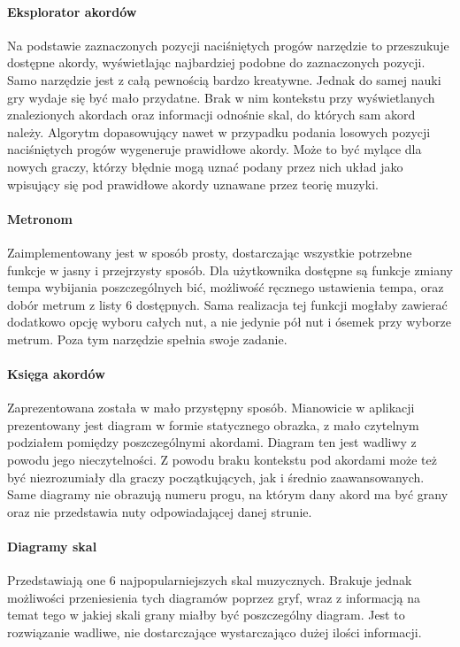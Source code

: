 \paragraph{Eksplorator akordów}
Na podstawie zaznaczonych pozycji naciśniętych progów narzędzie to przeszukuje dostępne akordy, wyświetlając najbardziej podobne do zaznaczonych pozycji. Samo narzędzie jest z całą pewnością bardzo kreatywne. Jednak do samej nauki gry wydaje się być mało przydatne. Brak w nim kontekstu przy wyświetlanych znalezionych akordach oraz informacji odnośnie skal, do których sam akord należy. Algorytm dopasowujący nawet w przypadku podania losowych pozycji naciśniętych progów wygeneruje prawidłowe akordy. Może to być mylące dla nowych graczy, którzy błędnie mogą uznać podany przez nich układ jako wpisujący się pod prawidłowe akordy uznawane przez teorię muzyki.



\paragraph{Metronom}
Zaimplementowany jest w sposób prosty, dostarczając wszystkie potrzebne funkcje w jasny i przejrzysty sposób. Dla użytkownika dostępne są funkcje zmiany tempa wybijania poszczególnych bić, możliwość ręcznego ustawienia tempa, oraz dobór metrum z listy 6 dostępnych. Sama realizacja tej funkcji mogłaby zawierać dodatkowo opcję wyboru całych nut, a nie jedynie pół nut i ósemek przy wyborze metrum. Poza tym narzędzie spełnia swoje zadanie.

\paragraph{Księga akordów}

Zaprezentowana została w mało przystępny sposób. Mianowicie w aplikacji prezentowany jest diagram w formie statycznego obrazka, z mało czytelnym podziałem pomiędzy poszczególnymi akordami. Diagram ten jest wadliwy z powodu jego nieczytelności. Z powodu braku kontekstu pod akordami może też być niezrozumiały dla graczy początkujących, jak i średnio zaawansowanych. Same diagramy nie obrazują numeru progu, na którym dany akord ma być grany oraz nie przedstawia nuty odpowiadającej danej strunie.

\paragraph{Diagramy skal}
Przedstawiają one 6 najpopularniejszych skal muzycznych. Brakuje jednak możliwości przeniesienia tych diagramów poprzez gryf, wraz z informacją na temat tego w jakiej skali grany miałby być poszczególny diagram. Jest to rozwiązanie wadliwe, nie dostarczające wystarczająco dużej ilości informacji. \\


